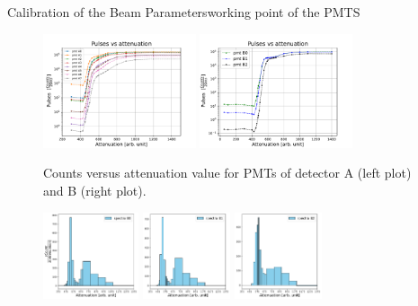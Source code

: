 \documentclass[9pt,a4paper]{beamer}
\begin{document}
\begin{frame}{Calibration of the Beam Parameters}{working point of the PMTS}

\begin{figure}
\includegraphics[width = 0.4\textwidth]{figures/AttenuationScanA.pdf}
\includegraphics[width = 0.4\textwidth]{figures/AttenuationScanB.pdf}
\caption{\footnotesize Counts versus attenuation value for PMTs of detector A (left plot) and B (right plot).}
\end{figure}

\begin{figure}
\centering
\includegraphics[width = 0.25\textwidth]{figures/spettro/B0.pdf}
\includegraphics[width = 0.23\textwidth]{figures/spettro/B1.pdf}
\includegraphics[width = 0.23\textwidth]{figures/spettro/B2.pdf}
\end{figure}


\end{frame}
\end{document}
